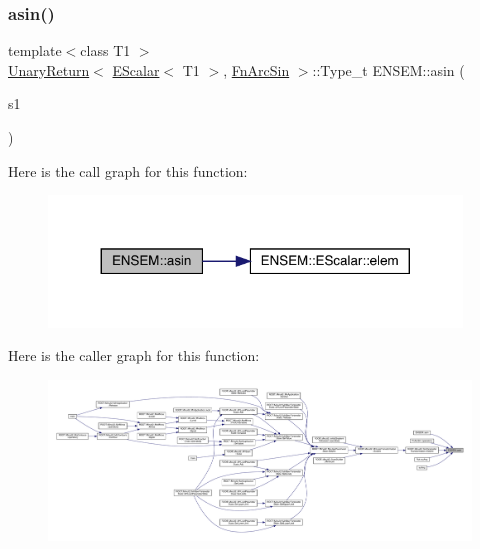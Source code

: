 \subsubsection{\texorpdfstring{asin()}{asin()}}
{\footnotesize\ttfamily template$<$class T1 $>$ \\
\mbox{\hyperlink{structENSEM_1_1UnaryReturn}{Unary\+Return}}$<$ \mbox{\hyperlink{classENSEM_1_1EScalar}{E\+Scalar}}$<$ T1 $>$, \mbox{\hyperlink{structENSEM_1_1FnArcSin}{Fn\+Arc\+Sin}} $>$\+::Type\+\_\+t E\+N\+S\+E\+M\+::asin (\begin{DoxyParamCaption}\item[{const \mbox{\hyperlink{classENSEM_1_1EScalar}{E\+Scalar}}$<$ T1 $>$ \&}]{s1 }\end{DoxyParamCaption})\hspace{0.3cm}{\ttfamily [inline]}}

Here is the call graph for this function\+:\nopagebreak
\begin{figure}[H]
\begin{center}
\leavevmode
\includegraphics[width=311pt]{d4/dca/group__escalar_gab463bdb3f1fadf6b5a87076e5d3dc9b9_cgraph}
\end{center}
\end{figure}
Here is the caller graph for this function\+:
\nopagebreak
\begin{figure}[H]
\begin{center}
\leavevmode
\includegraphics[width=350pt]{d4/dca/group__escalar_gab463bdb3f1fadf6b5a87076e5d3dc9b9_icgraph}
\end{center}
\end{figure}
\mbox{\label{group__escalar_ga3169598490417ab5713660967ec6b658}} 
